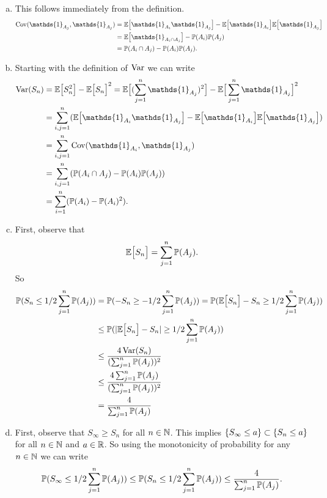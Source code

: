 \begin{solution}
	\begin{enumerate}[(a)]
		\item This follows immediately from the definition. 
		\begin{align*}
			\operatorname{Cov}(\mathds{1}_{A_j},\mathds{1}_{A_j}) &= \E{\mathds{1}_{A_i}\mathds{1}_{A_j}} - \E{\mathds{1}_{A_i}}\E{\mathds{1}_{A_j}} \\
			&= \E{\mathds{1}_{A_i\cap A_j}} - \prob(A_i)\prob(A_j) \\
			&= \prob(A_i \cap A_j) - \prob(A_i)\prob(A_j).
		\end{align*}
		\item Starting with the definition of $ \operatorname{Var} $ we can write
		\begin{align*}
			\Var(S_n) &= \E{S_n^2} - \E{S_n}^2 = \E{(\sum_{j=1}^{n} \mathds{1}_{A_j})^2} - \E{\sum_{j=1}^{n} \mathds{1}_{A_j}}^2 \\
			&= \sum_{i,j=1}^{n} (\E{\mathds{1}_{A_i}\mathds{1}_{A_j}} - \E{\mathds{1}_{A_i}}\E{\mathds{1}_{A_j}}) \\
			&= \sum_{i,j=1}^{n} \operatorname{Cov}(\mathds{1}_{A_i},\mathds{1}_{A_j}) \\
			&= \sum_{i,j=1}^{n} (\prob(A_i \cap A_j) - \prob(A_i)\prob(A_j)) \\
			&= \sum_{i=1}^{n} (\prob(A_i) - \prob(A_i)^2).
		\end{align*}
		\item First, observe that
		\[ \mathbb{E}\big[S_n\big] = \sum_{j=1}^{n}\mathbb{P}(A_j). \]
		So
		\begin{align*}
			\mathbb{P}(S_n \leq 1/2\sum_{j=1}^{n}\mathbb{P}(A_j))& = \mathbb{P}(-S_n \geq -1/2\sum_{j=1}^{n}\mathbb{P}(A_j)) = \mathbb{P}(\mathbb{E}\big[S_n\big] - S_n \geq 1/2\sum_{j=1}^{n}\mathbb{P}(A_j))  \\
			& \leq \mathbb{P}(|\mathbb{E}\big[S_n\big] - S_n| \geq 1/2\sum_{j=1}^{n}\mathbb{P}(A_j)) \\ 
			& \leq \frac{4\operatorname{Var}(S_n)}{(\sum_{j=1}^{n}\mathbb{P}(A_j))^2} \\
			& \leq \frac{4\sum_{j=1}^{n}\mathbb{P}(A_j)}{(\sum_{j=1}^{n}\mathbb{P}(A_j))^2} \\
			& = \frac{4}{\sum_{j=1}^{n}\mathbb{P}(A_j)}
		\end{align*}
		
		\item First, observe that $ S_\infty \geq S_n $ for all $ n\in \mathbb{N} $. This implies $ \{S_\infty \leq a\} \subset \{S_n \leq a\} $ for all $ n\in \mathbb{N} $ and $ a \in \mathbb{R} $. So using the monotonicity of probability for any $ n\in \mathbb{N} $ we can write
		\[ \mathbb{P}(S_\infty \leq 1/2\sum_{j=1}^{n} \mathbb{P}(A_j)) \leq \mathbb{P}(S_n \leq 1/2\sum_{j=1}^{n} \mathbb{P}(A_j)) \leq \frac{4}{\sum_{j=1}^{n}\mathbb{P}(A_j)}. \]
		

\end{enumerate}
\end{solution}
